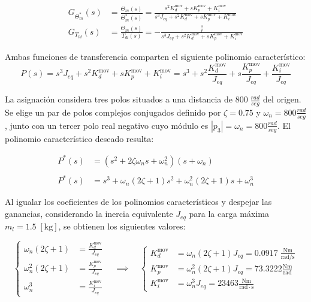\documentclass[blue,fullpaper]{ludusofficial}  %
\begin{document}
\begin{align}
G_{\Theta^{*}_{m}}(s) & = \frac{\Theta_{m}(s)}{\Theta^{*}_{m}(s) }  = \frac{  s^{2}K_{d}^{\text{mov}} + sK_{p}^{\text{mov}} + K_{i}^{\text{mov}} }{ s^{3}J_{eq} + s^{2}K_{d}^{\text{mov}} + sK_{p}^{\text{mov}}  + K_{i}^{\text{mov}} } \\
G_{T_{ld}}(s) & = \frac{\Theta_{m}(s)}{T_{dl}(s) } =  - \frac{\frac{s}{r}}{ s^{3}J_{eq} + s^{2}K_{d}^{\text{mov}} + sK_{p}^{\text{mov}}  + K_{i}^{\text{mov}} } 
\end{align}

Ambas funciones de transferencia comparten el siguiente polinomio característico:
\[
P(s) = s^{3}J_{eq} + s^{2}K_{d}^{\text{mov}} + sK_{p}^{\text{mov}}  + K_{i}^{\text{mov}} = s^{3}+ s^{2}\frac{K_{d}^{\text{mov}}}{J_{eq}} + s\frac{K_{p}^{\text{mov}}}{J_{eq}}  + \frac{K_{i}^{\text{mov}}}{J_{eq}}
\]

La asignación considera tres polos situados a una distancia de $800\;\frac{rad}{seg}$ del origen. Se elige un par de polos complejos conjugados definido por $\zeta=0.75$ y $\omega_{n}=800 \frac{rad}{seg}$, junto con un tercer polo real negativo cuyo módulo es $|p_{3}|=\omega_{n}=800 \frac{rad}{seg}$. El polinomio característico deseado resulta:

\begin{align}
P^{*}(s)  & = (s^{2}+2\zeta \omega_{n}s+\omega_{n}^{2})(s+\omega_{n})  \\
 \\
P^{*}(s)  & = s^{3} + \omega_{n} (2\zeta+1) s^{2} + \omega_{n}^{2} (2\zeta+1)s + \omega_{n}^{3}
\end{align}

Al igualar los coeficientes de los polinomios característicos y despejar las ganancias, %
considerando la inercia equivalente $J_{eq}$ para la carga máxima $m_{l} =1.5\;[\text{kg}]$, se obtienen los siguientes valores:

\[
\begin{cases}
\omega_{n} (2\zeta+1) & = \frac{K_{d}^{\text{mov}}}{J_{eq}} \\
\omega_{n}^{2} (2\zeta+1) & = \frac{K_{p}^{\text{mov}}}{J_{eq}} \\
\omega_{n}^{3} & = \frac{K_{i}^{\text{mov}}}{J_{eq}}
\end{cases} \quad  \implies \quad 
\begin{cases}
 K_{d}^{\text{mov}} & = \omega_{n} (2\zeta+1){J_{eq}} = 0.0917 \; \mathrm{\frac{Nm}{rad/s}}\\
K_{p}^{\text{mov}} & = \omega_{n}^{2} (2\zeta+1) {J_{eq}} = 73.3222 \mathrm{\frac{Nm}{rad}}\\
K_{i}^{\text{mov}} & = \omega_{n}^{3}{J_{eq}} = 23463 \mathrm{\frac{Nm}{rad\cdot s}}
\end{cases}
\]
\end{document}
